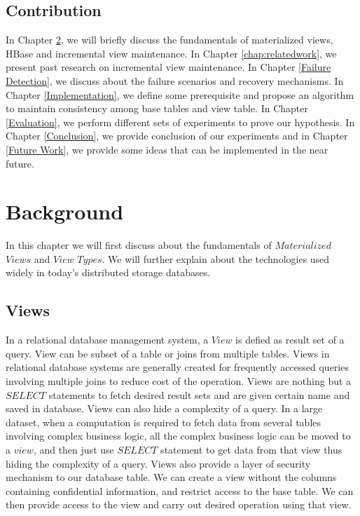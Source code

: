 \documentclass[11pt,a4paper,bibtotoc,idxtotoc,headsepline,footsepline,footexclude,BCOR12mm,DIV13]{scrbook}
\begin{document}
\section{Contribution}
In Chapter \ref{chap:background}, we will briefly discuss the fundamentals of materialized views, HBase and incremental view maintenance. In Chapter \ref{chap:relatedwork}, we present past research on incremental view maintenance. In Chapter \ref{Failure Detection}, we discuss about the failure scenarios and recovery mechanisms. In Chapter \ref{Implementation}, we define some prerequisite and propose an algorithm to maintain consistency among base tables and view table. In Chapter \ref{Evaluation}, we perform different sets of experiments to prove our hypothesis. In Chapter \ref{Conclusion}, we provide conclusion of our experiments and in Chapter \ref{Future Work}, we provide some ideas that can be implemented in the near future.


\chapter{Background}
\label{chap:background}

In this chapter we will first discuss about the fundamentals of $Materialized$ $Views$ and $View$ $Types$. We will further explain about the technologies used widely in today's distributed storage databases. 

\section{Views}
In a relational database management system, a $View$ is defied as result set of a query. View can be subset of a table or joins from multiple tables. Views in relational database systems are generally created for frequently accessed queries involving multiple joins to reduce cost of the operation. Views are nothing but a $SELECT$ statements to fetch desired result sets and are given certain name and saved in database. Views can also hide a complexity of a query. In a large dataset, when a computation is required to fetch data from several tables involving complex business logic, all the complex business logic can be moved to a $view$, and then just use $SELECT$ statement to get data from that view thus hiding the complexity of a query. Views also provide a layer of security mechanism to our database table. We can create a view without the columns containing confidential information, and restrict access to the base table. We can then provide access to the view and carry out desired operation using that view. 
\end{document}
